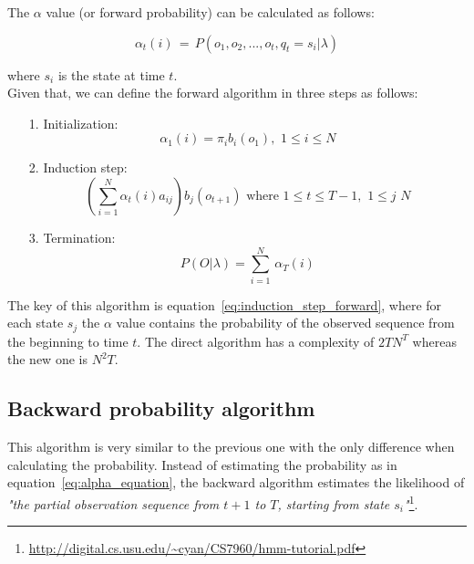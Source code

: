 \noindent The $\alpha$ value (or forward probability) can be calculated as follows:

\begin{equation}
\label{eq:alpha_equation}
	\alpha_{t}(i) \, = \, P(o_{1}, o_{2}, ... , o_{t}, q_{t} = s_{i} | \lambda)
\end{equation}

\noindent where $s_{i}$ is the state at time $t$. \\
Given that, we can define the forward algorithm in three steps as follows:

\begin{itemize}
	\item[1.]{Initialization:} \\
		\begin{equation}
			\alpha_{1}(i) = \pi_{i}b_{i}(o_{1}), \,\, 1 \leq i \leq N
		\end{equation}
	\item[2.]{Induction step:} \\
		\begin{equation}
		\label{eq:induction_step_forward}
			\left ( \sum_{i=1}^{N} \alpha_{t}(i) a_{ij} \right ) b_{j}(o_{t+1}) \,\, \text{where} \,\, 1 \leq t \leq T - 1, \,\, 1 \leq j \,\, N
		\end{equation}
	\item[3.]{Termination:} \\
		\begin{equation}
			P(O|\lambda) = \sum_{i=1}^{N} \, \alpha_{T}(i)
		\end{equation}
\end{itemize}

\noindent The key of this algorithm is equation~\ref{eq:induction_step_forward}, where for each state $s_{j}$ the $\alpha$ value contains the probability of the observed sequence from the beginning to time $t$. The direct algorithm has a complexity of $2TN^{T}$ whereas the new one is $N^{2}T$.

\subsection{Backward probability algorithm}
This algorithm is very similar to the previous one with the only difference when calculating the probability. Instead of estimating the probability as in equation~\ref{eq:alpha_equation}, the backward algorithm estimates the likelihood of \textit{"the partial observation sequence from $t+1$ to $T$, starting from state $s_{i}$"}\footnote{\url{http://digital.cs.usu.edu/~cyan/CS7960/hmm-tutorial.pdf}}. \\

